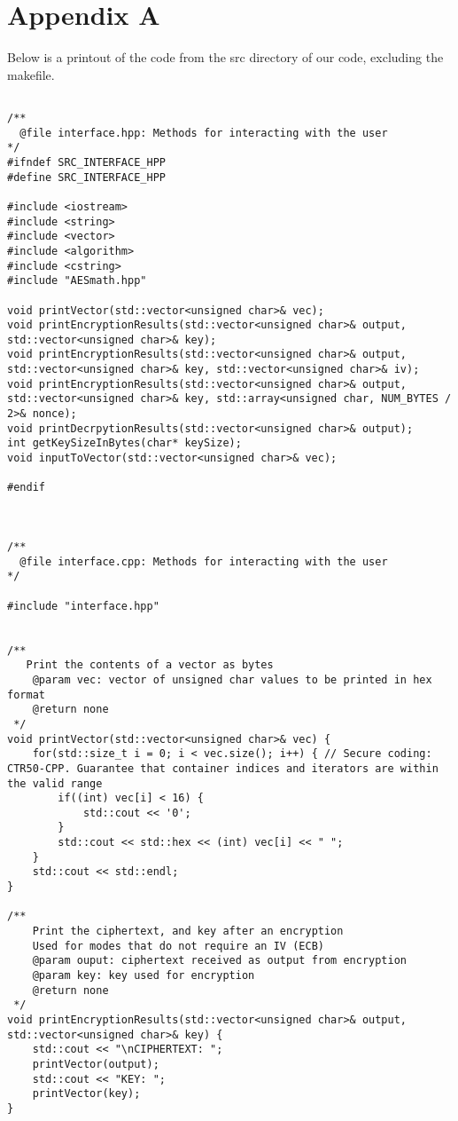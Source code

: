 \documentclass[a4paper,12pt]{article}
\begin{document}
\section{Appendix A}

Below is a printout of the code from the src directory of our code, excluding the makefile.

{\selectfont
\begin{lstlisting}

/**
  @file interface.hpp: Methods for interacting with the user
*/
#ifndef SRC_INTERFACE_HPP
#define SRC_INTERFACE_HPP

#include <iostream>
#include <string>
#include <vector>
#include <algorithm>
#include <cstring>
#include "AESmath.hpp"

void printVector(std::vector<unsigned char>& vec);
void printEncryptionResults(std::vector<unsigned char>& output, std::vector<unsigned char>& key);
void printEncryptionResults(std::vector<unsigned char>& output, std::vector<unsigned char>& key, std::vector<unsigned char>& iv);
void printEncryptionResults(std::vector<unsigned char>& output, std::vector<unsigned char>& key, std::array<unsigned char, NUM_BYTES / 2>& nonce);
void printDecrpytionResults(std::vector<unsigned char>& output);
int getKeySizeInBytes(char* keySize);
void inputToVector(std::vector<unsigned char>& vec);

#endif



/**
  @file interface.cpp: Methods for interacting with the user
*/

#include "interface.hpp"


/**
   Print the contents of a vector as bytes
    @param vec: vector of unsigned char values to be printed in hex format
    @return none
 */
void printVector(std::vector<unsigned char>& vec) {
    for(std::size_t i = 0; i < vec.size(); i++) { // Secure coding: CTR50-CPP. Guarantee that container indices and iterators are within the valid range
        if((int) vec[i] < 16) {
            std::cout << '0';
        }
        std::cout << std::hex << (int) vec[i] << " ";
    }
    std::cout << std::endl;
}

/**
    Print the ciphertext, and key after an encryption
    Used for modes that do not require an IV (ECB)
    @param ouput: ciphertext received as output from encryption
    @param key: key used for encryption
    @return none
 */
void printEncryptionResults(std::vector<unsigned char>& output, std::vector<unsigned char>& key) {
    std::cout << "\nCIPHERTEXT: ";
    printVector(output);
    std::cout << "KEY: ";
    printVector(key);
}


\end{lstlisting}}
\end{document}
